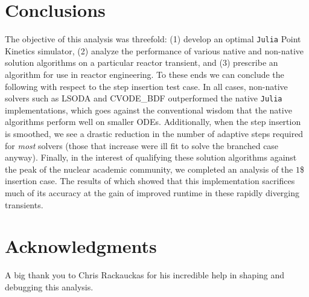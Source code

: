 \documentclass[review,onefignum,onetabnum]{siamart171218}
\begin{document}
\section{Conclusions}
The objective of this analysis was threefold: (1) develop an optimal \texttt{Julia}
Point Kinetics simulator, (2) analyze the performance of various native and non-native
solution algorithms on a particular reactor transient, and (3) prescribe an algorithm
for use in reactor engineering. To these ends we can conclude the following with respect
to the step insertion test case. In all cases, non-native solvers such as LSODA and
CVODE\_BDF outperformed the native \texttt{Julia} implementations, which goes
against the conventional wisdom that the native algorithms perform well on smaller
ODEs. Additionally, when the step insertion is smoothed, we see a drastic reduction in the number of adaptive
steps required for \emph{most} solvers (those that increase were ill fit to solve the
branched case anyway). Finally, in the interest of qualifying these solution algorithms
against the peak of the nuclear academic community, we completed an analysis of the $1$\$
insertion case. The results of which showed that this implementation sacrifices much
of its accuracy at the gain of improved runtime in these rapidly diverging transients.

\section*{Acknowledgments}
A big thank you to Chris Rackauckas for his incredible help in shaping and debugging
this analysis.



\end{document}
